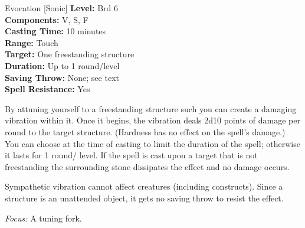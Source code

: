 {Evocation [Sonic]}
{
	\textbf{Level:}
	Brd 6\\
	\textbf{Components:}
	V, S, F\\
	\textbf{Casting Time:}
	10 minutes\\
	\textbf{Range:}
	Touch\\
	\textbf{Target:}
	One freestanding structure\\
	\textbf{Duration:}
	Up to 1 round/level\\
	\textbf{Saving Throw:}
	None; see text\\
	\textbf{Spell Resistance:}
	Yes\\
}
{
	By attuning yourself to a freestanding structure such you can create a damaging vibration within it. Once it begins, the vibration deals 2d10 points of damage per round to the target structure. (Hardness has no effect on the spell's damage.) You can choose at the time of casting to limit the duration of the spell; otherwise it lasts for 1 round/ level. If the spell is cast upon a target that is not freestanding the surrounding stone dissipates the effect and no damage occurs.

	Sympathetic vibration cannot affect creatures (including constructs). Since a structure is an unattended object, it gets no saving throw to resist the effect.

	\textit{Focus:}
	A tuning fork.

}
